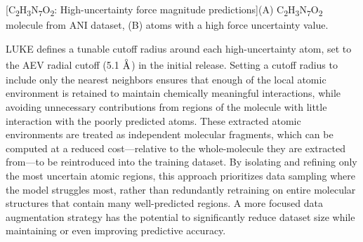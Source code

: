 \begin{flushleft}
\begin{multiFigure}
\begin{centering}
[C\textsubscript{2}H\textsubscript{3}N\textsubscript{7}O\textsubscript{2}: High-uncertainty force magnitude predictions]{(A) C\textsubscript{2}H\textsubscript{3}N\textsubscript{7}O\textsubscript{2} molecule from ANI dataset, (B) atoms with a high force uncertainty value.
}
\label{fig:uncertain_atoms}
\end{centering}
\end{multiFigure}
\end{flushleft}

LUKE defines a tunable cutoff radius around each high-uncertainty atom, set to the AEV radial cutoff (5.1 $\angstrom$) in the initial release. 
Setting a cutoff radius to include only the nearest neighbors ensures that enough of the local atomic environment is retained to maintain chemically meaningful interactions, while avoiding unnecessary contributions from regions of the molecule with little interaction with the poorly predicted atoms. 
These extracted atomic environments are treated as independent molecular fragments, which can be computed at a reduced cost---relative to the whole-molecule they are extracted from---to be reintroduced into the training dataset.
By isolating and refining only the most uncertain atomic regions, this approach prioritizes data sampling where the model struggles most, rather than redundantly retraining on entire molecular structures that contain many well-predicted regions.
A more focused data augmentation strategy has the potential to significantly reduce dataset size while maintaining or even improving predictive accuracy.


